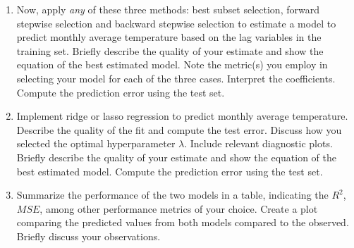\documentclass[11pt,twoside]{article}
\newcommand{\pts}[1]{\marginpar{ \small\hspace{0pt} \textit{[#1]} } }
\newcommand{\?}{\stackrel{?}{=}}
\newcommand{\la}{\lambda}
\begin{document}
\begin{enumerate}[\bf (a)]
\item Now, apply \textit{any} of these three methods: \pts{5}
  best subset selection, forward stepwise selection and backward stepwise
  selection to estimate a model to predict monthly average temperature based on the lag variables in the training set.
  Briefly describe the quality of your estimate and show the equation of the best estimated model.
  Note the metric(s) you employ in selecting your model for each of the three cases.
  Interpret the coefficients. Compute the prediction error using the test set.

\item Implement ridge or lasso regression to predict monthly average temperature. Describe the quality of the fit and compute the test error. \pts{5}
  Discuss how you selected the optimal hyperparameter $\la$. Include relevant diagnostic plots.
  Briefly describe the quality of your estimate and show the equation of the best estimated model.
  Compute the prediction error using the test set.
  
  
\item Summarize the performance of the two models in a table, \pts{4}
  indicating the $R^{2}$, $MSE$, among other performance metrics of your choice.
  Create a plot comparing the predicted values from both models compared to the observed.
  Briefly discuss your observations.
\end{enumerate}

\bigskip



\bigskip

\end{document}
